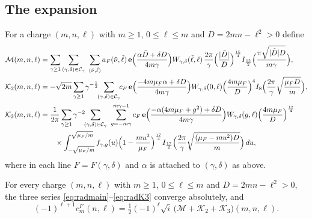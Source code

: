 \subsection{The expansion}
For a charge $(m,n,\ell)$ with $m\ge1$, $0\le\ell\le m$ and $D=2mn-\ell^2>0$ define
\begin{align}
\mathcal M(m,n,\ell)&=\sum_{\gamma\ge1}\sum_{(\gamma,\delta)\in\mathcal C_\gamma}\ \sum_{(\tilde\nu,\tilde\ell)}a_{F}(\tilde\nu,\tilde\ell)\,\e\Big(\frac{\alpha\tilde D+\delta D}{4m\gamma}\Big)W_{\gamma,\delta}(\tilde\ell,\ell)\,\frac{2\pi}\gamma\Big(\frac{|\tilde D|}{D}\Big)^{\frac{15}4}I_{\frac{15}2}\Big(\frac{\pi\sqrt{|\tilde D|D}}{m\gamma}\Big),\label{eq:radmain}\\
\mathcal K_2(m,n,\ell)&=-\sqrt{2m}\sum_{\gamma\ge1}\gamma^{-\frac12}\!\!\sum_{(\gamma,\delta)\in\mathcal C_\gamma}\!\! c_F\,\e\Big(\frac{-4m\mu_F\alpha+\delta D}{4m\gamma}\Big)W_{\gamma,\delta}(0,\ell)\Big(\frac{4m\mu_F}{D}\Big)^4I_8\Big(\frac{2\pi}\gamma\sqrt{\frac{\mu_FD}m}\Big),\label{eq:radK2}\\
\mathcal K_3(m,n,\ell)&=\frac1{2\pi}\sum_{\gamma\ge1}\gamma^{-2}\!\!\sum_{(\gamma,\delta)\in\mathcal C_\gamma}\ \sum_{g=-m\gamma}^{m\gamma-1}c_F\,\e\Big(\frac{-\alpha(4m\mu_F+g^2)+\delta D}{4m\gamma}\Big)W_{\gamma,\delta}(g,\ell)\Big(\frac{4m\mu_F}{D}\Big)^{\frac{17}4}\label{eq:radK3}\\
&\qquad\times\int_{-\sqrt{\mu_F/m}}^{\sqrt{\mu_F/m}}f_{\gamma,g}(u)\Big(1-\frac{mu^2}{\mu_F}\Big)^{\frac{17}4}I_{\frac{17}2}\Big(\frac{2\pi}\gamma\sqrt{\frac{(\mu_F-mu^2)D}m}\Big)\,du,\notag
\end{align}
where in each line $F=F(\gamma,\delta)$ and $\alpha$ is attached to $(\gamma,\delta)$ as above.

\begin{theorem}\label{thm:rad}
For every charge $(m,n,\ell)$ with $m\ge1$, $0\le\ell\le m$ and $D=2mn-\ell^2>0$, the three series \eqref{eq:radmain}--\eqref{eq:radK3} converge absolutely, and
\begin{equation}\label{eq:hypR}
(-1)^{\ell+1}c^F_m(n,\ell)=\tfrac12(-1)^\ell\sqrt i\,\big(\mathcal M+\mathcal K_2+\mathcal K_3\big)(m,n,\ell).
\end{equation}
\end{theorem}

